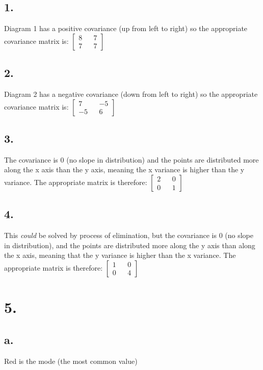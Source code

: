 \documentclass[11pt]{article}
\begin{document}
\subsection*{1.}
\label{sec:org7b523ab}
Diagram 1 has a positive covariance (up from left to right) so the appropriate
covariance matrix is: \(\begin{bmatrix}8 && 7 \\ 7 && 7\end{bmatrix}\)
\subsection*{2.}
\label{sec:org8d25f31}
Diagram 2 has a negative covariance (down from left to right) so the appropriate
covariance matrix is:
\(\begin{bmatrix}7 && -5 \\
                -5 && 6 \end{bmatrix}\)
\subsection*{3.}
\label{sec:org16d64bd}
The covariance is 0 (no slope in distribution) and the points are distributed more
along the x axis than the y axis, meaning the x variance is higher than
the y variance. The appropriate matrix is therefore:
\(\begin{bmatrix} 2 && 0 \\ 0 && 1 \end{bmatrix}\)
\subsection*{4.}
\label{sec:orgf35e578}
This \emph{could} be solved by process of elimination, but the covariance is 0 (no
slope in distribution), and the points are distributed more
along the y axis than along the x axis, meaning that the y variance is higher than
the x variance. The appropriate matrix is therefore:
\(\begin{bmatrix}1 && 0 \\ 0 && 4 \end{bmatrix}\)
\section*{5.}
\label{sec:orgf517ce1}
\subsection*{a.}
\label{sec:org85344b0}
Red is the mode (the most common value)
\end{document}
